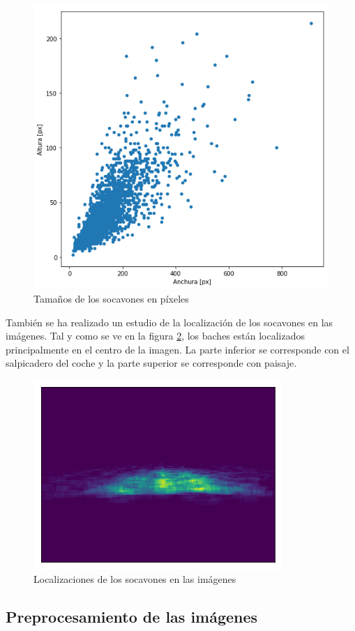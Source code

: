 \begin{figure}[H]
	\centering
	\includegraphics[width=0.7\linewidth]{images/pothole_sizes_scatter_plot.png}
	\caption{Tamaños de los socavones en píxeles}
	\label{fig:potholesizes}
\end{figure}

También se ha realizado un estudio de la localización de los socavones en las imágenes. Tal y como se ve en la figura \ref{fig:potholeslocations}, los baches están localizados principalmente en el centro de la imagen. La parte inferior se corresponde con el salpicadero del coche y la parte superior se corresponde con paisaje.

\begin{figure}[H]
	\centering
	\includegraphics[width=0.7\linewidth]{images/pothole_locations_heatmap.png}
	\caption{Localizaciones de los socavones en las imágenes}
	\label{fig:potholeslocations}
\end{figure}

\subsection{Preprocesamiento de las imágenes}
\label{subsec:preprocesamiento_de_las_imagenes}

